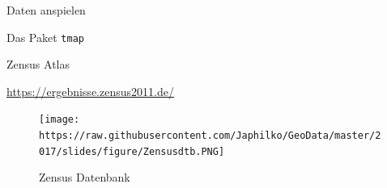 \begin{frame}[fragile]{Daten anspielen}

\begin{Shaded}
\begin{Highlighting}[]
\OperatorTok{$}\StringTok{ }
\end{Highlighting}
\end{Shaded}

\end{frame}

\begin{frame}[fragile]{Das Paket \texttt{tmap}}

\begin{Shaded}
\begin{Highlighting}[]
\end{Highlighting}
\end{Shaded}

\begin{Shaded}
\begin{Highlighting}[]
\OperatorTok{$}\NormalTok{num_plz[}\OperatorTok{$}\NormalTok{num_plz)] <-}\StringTok{ }
 \NormalTok{)}
\end{Highlighting}
\end{Shaded}

\end{frame}

\begin{frame}{Zensus Atlas}

\url{https://ergebnisse.zensus2011.de/}

\begin{figure}
\centering
\texttt{[image: https://raw.githubusercontent.com/Japhilko/GeoData/master/2017/slides/figure/Zensusdtb.PNG]}
\caption{Zensus Datenbank}
\end{figure}

\end{frame}
